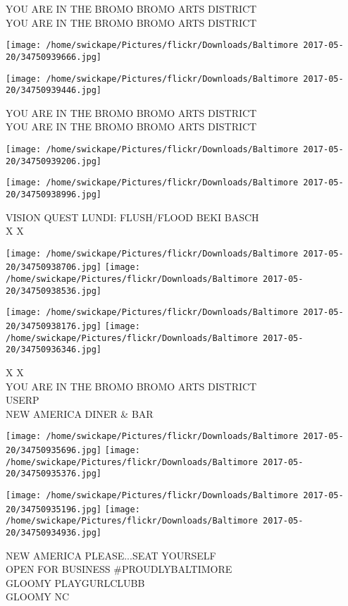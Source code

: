 \documentclass[10pt,letterpaper]{article}
\begin{document}
YOU ARE IN THE BROMO BROMO ARTS DISTRICT\\
YOU ARE IN THE BROMO BROMO ARTS DISTRICT
\pagebreak

\texttt{[image: /home/swickape/Pictures/flickr/Downloads/Baltimore 2017-05-20/34750939666.jpg]}

\vspace{0.25in}
\texttt{[image: /home/swickape/Pictures/flickr/Downloads/Baltimore 2017-05-20/34750939446.jpg]}

YOU ARE IN THE BROMO BROMO ARTS DISTRICT\\
YOU ARE IN THE BROMO BROMO ARTS DISTRICT
\pagebreak

\texttt{[image: /home/swickape/Pictures/flickr/Downloads/Baltimore 2017-05-20/34750939206.jpg]}

\vspace{0.25in}
\texttt{[image: /home/swickape/Pictures/flickr/Downloads/Baltimore 2017-05-20/34750938996.jpg]}

VISION QUEST LUNDI: FLUSH/FLOOD BEKI BASCH\\
X X
\pagebreak

\texttt{[image: /home/swickape/Pictures/flickr/Downloads/Baltimore 2017-05-20/34750938706.jpg]}
\texttt{[image: /home/swickape/Pictures/flickr/Downloads/Baltimore 2017-05-20/34750938536.jpg]}

\texttt{[image: /home/swickape/Pictures/flickr/Downloads/Baltimore 2017-05-20/34750938176.jpg]}
\texttt{[image: /home/swickape/Pictures/flickr/Downloads/Baltimore 2017-05-20/34750936346.jpg]}

X X\\
YOU ARE IN THE BROMO BROMO ARTS DISTRICT\\
USERP\\
NEW AMERICA DINER \& BAR
\pagebreak

\texttt{[image: /home/swickape/Pictures/flickr/Downloads/Baltimore 2017-05-20/34750935696.jpg]}
\texttt{[image: /home/swickape/Pictures/flickr/Downloads/Baltimore 2017-05-20/34750935376.jpg]}

\texttt{[image: /home/swickape/Pictures/flickr/Downloads/Baltimore 2017-05-20/34750935196.jpg]}
\texttt{[image: /home/swickape/Pictures/flickr/Downloads/Baltimore 2017-05-20/34750934936.jpg]}

NEW AMERICA PLEASE...SEAT YOURSELF\\
OPEN FOR BUSINESS \#PROUDLYBALTIMORE\\
GLOOMY PLAYGURLCLUBB\\
GLOOMY NC
\pagebreak
\end{document}
